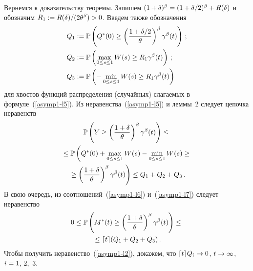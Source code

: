 \begin{multicols}{2}
Вернемся к доказательству теоремы. Запишем
$(1\hm+\delta)^\beta\hm=(1\hm+\delta/2)^\beta\hm+R(\delta)$ и обозначим
$R_1:=R(\delta)/(2{\theta}^\beta)\hm>0$. Введем также  обозначения
\begin{align*}
Q_1&:=\mathbb{P} \left(Q^*(0) \geq \left(\displaystyle\frac{\displaystyle 1+\delta/2\mathstrut}{\displaystyle \theta\mathstrut}\right)^\beta \gamma^\beta(t)\right)\,;
\\
Q_2&:=\mathbb{P} \left(\max_{0 \leq s \leq 1}W(s) \geq R_1 \gamma^\beta(t) \right)\,;
\\
Q_3&:=\mathbb{P} \left(-\min_{0 \leq s \leq 1}W(s) \geq R_1 \gamma^\beta(t) \right)
\end{align*}
для хвостов функций распределения (случайных) слагаемых в формуле~(\ref{asymp1-l5}).
 Из неравенства~(\ref{asymp1-l5}) и леммы~2 следует цепочка неравенств
\begin{multline}
\mathbb{P} \left( Y \geq \left( \displaystyle\frac{\displaystyle 1+\delta\mathstrut}{\displaystyle \theta\mathstrut}
\right)^\beta\gamma^\beta(t)\right)\leq{}\\
{}\leq \mathbb{P} \left( Q^*(0)+\max\limits_{0 \leq s \leq 1}W(s)-\min\limits_{0 \leq s
\leq 1}W(s)  \geq{}\right.\\
\left.{}\geq \left( \displaystyle\frac{\displaystyle 1+\delta\mathstrut}{\displaystyle \theta\mathstrut}
\right)^\beta\gamma^\beta(t)\right)
\leq Q_1+Q_2+Q_3\,.\label{asymp1-l7}
\end{multline}
В свою очередь, из соотношений~(\ref{asymp1-l6}) и~(\ref{asymp1-l7})
следует неравенство
\begin{multline*}
0 \leq \mathbb{P}\left(M^*(t) \geq \left( \displaystyle\frac{\displaystyle 1+\delta\mathstrut}{\displaystyle \theta\mathstrut}
\right)^\beta \gamma^\beta(t)  \right) \leq{}\\
{}\leq \lceil t \rceil
(Q_1+Q_2+Q_3)\,.
\end{multline*}
Чтобы получить неравенство~(\ref{asymp1-l2}), докажем, что
 $\lceil t \rceil Q_i \hm\to 0$, $t \hm\to \infty$,
$i\hm=1$, 2,~3.

\pagebreak


\end{multicols}
